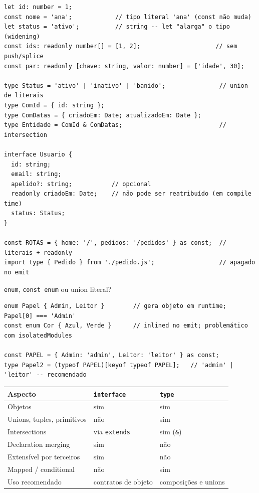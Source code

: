 \documentclass[12pt,a4paper,oneside]{book}
\newcommand{\code}[1]{\texttt{#1}}
\begin{document}
\begin{verbatim}
let id: number = 1;
const nome = 'ana';            // tipo literal 'ana' (const não muda)
let status = 'ativo';          // string -- let "alarga" o tipo (widening)
const ids: readonly number[] = [1, 2];                     // sem push/splice
const par: readonly [chave: string, valor: number] = ['idade', 30];

type Status = 'ativo' | 'inativo' | 'banido';               // union de literais
type ComId = { id: string };
type ComDatas = { criadoEm: Date; atualizadoEm: Date };
type Entidade = ComId & ComDatas;                           // intersection

interface Usuario {
  id: string;
  email: string;
  apelido?: string;           // opcional
  readonly criadoEm: Date;    // não pode ser reatribuído (em compile time)
  status: Status;
}

const ROTAS = { home: '/', pedidos: '/pedidos' } as const;  // literais + readonly
import type { Pedido } from './pedido.js';                  // apagado no emit
\end{verbatim}

\code{enum}, \code{const enum} ou union literal?

\begin{verbatim}
enum Papel { Admin, Leitor }        // gera objeto em runtime; Papel[0] === 'Admin'
const enum Cor { Azul, Verde }      // inlined no emit; problemático com isolatedModules

const PAPEL = { Admin: 'admin', Leitor: 'leitor' } as const;
type Papel2 = (typeof PAPEL)[keyof typeof PAPEL];   // 'admin' | 'leitor' -- recomendado
\end{verbatim}

\begin{center}
\begin{tabular}{@{}lll@{}}
\toprule
\textbf{Aspecto} & \code{interface} & \code{type} \\
\midrule
Objetos & sim & sim \\
Unions, tuples, primitivos & não & sim \\
Intersections & via \code{extends} & sim (\code{\&}) \\
Declaration merging & sim & não \\
Extensível por terceiros & sim & não \\
Mapped / conditional & não & sim \\
Uso recomendado & contratos de objeto & composições e unions \\
\bottomrule
\end{tabular}
\end{center}
\end{document}
